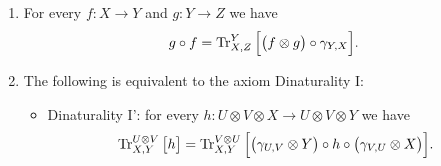 \begin{proposition}\label{prop:dinaturality}\mbox{}
\begin{enumerate}
 \item For every $f:X\to Y$ and $g:Y\to Z$ we have
 \[g\circ f=\operatorname{Tr}^Y_{X,Z}\Big[\big(f\otimes g\big)\circ\gamma_{Y,X}\Big].\]
 \item The following is equivalent to the axiom Dinaturality I:
 \begin{itemize}
  \item Dinaturality I': for every $h:U\otimes V\otimes X\to U\otimes V\otimes Y$ we have
 \[\operatorname{Tr}^{U\otimes V}_{X,Y}\big[h\big]=\operatorname{Tr}^{V\otimes U}_{X,Y}\Big[\big(\gamma_{U,V}\otimes Y\big)\circ h\circ\big(\gamma_{V,U}\otimes X\big)\Big].\]
 \end{itemize}
\end{enumerate}
\end{proposition}
